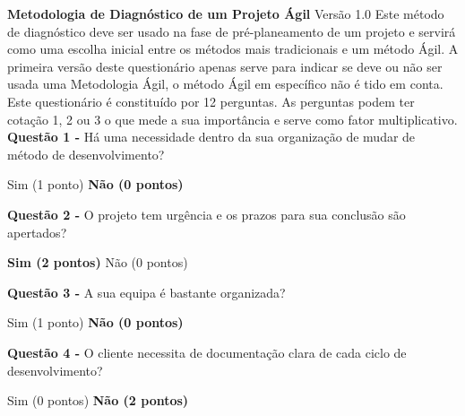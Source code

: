 \begin{framed}
\noindent\textbf{Metodologia de Diagnóstico de um Projeto Ágil}
\qquad
Versão 1.0
\vspace{2mm}
\newline Este método de diagnóstico deve ser usado na fase de pré-planeamento de um projeto e servirá como uma escolha inicial entre os métodos mais tradicionais e um método Ágil. A primeira versão deste questionário apenas serve para indicar se deve ou não ser usada uma Metodologia Ágil, o método Ágil em específico não é tido em conta.
\vspace{1mm}
\newline Este questionário é constituído por 12 perguntas. As perguntas podem ter cotação 1, 2 ou 3 o que mede a sua importância e serve como fator multiplicativo.
\vspace{5mm}
\newline\textbf{Questão 1 - } Há uma necessidade dentro da sua organização de mudar de método de desenvolvimento?
\newline \begin{center} Sim (1 ponto) \hspace{30mm} \textbf{Não (0 pontos)}\end{center}
\vspace{2mm}
\newline\textbf{Questão 2 - } O projeto tem urgência e os prazos para sua conclusão são apertados?
\newline \begin{center} \textbf{Sim (2 pontos)} \hspace{30mm} Não (0 pontos)\end{center}
\vspace{2mm}
\newline\textbf{Questão 3 - } A sua equipa é bastante organizada?
\newline \begin{center} Sim (1 ponto) \hspace{30mm} \textbf{Não (0 pontos)}\end{center}
\vspace{2mm}
\newline\textbf{Questão 4 - } O cliente necessita de documentação clara de cada ciclo de desenvolvimento?
\newline \begin{center} Sim (0 pontos) \hspace{30mm} \textbf{Não (2 pontos)}\end{center}
\vspace{2mm}

\end{framed}
